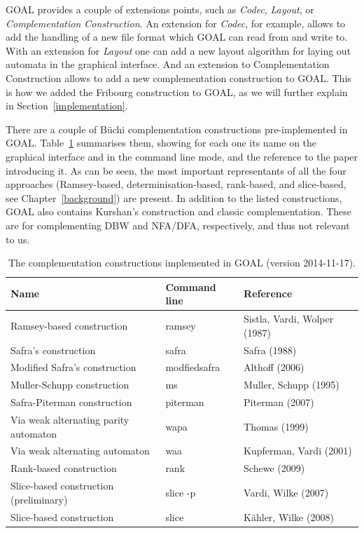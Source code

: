 GOAL provides a couple of extensions points, such as \textit{Codec}, \textit{Layout}, or \textit{Complementation Construction}. An extension for \textit{Codec}, for example, allows to add the handling of a new file format which GOAL can read from and write to. With an extension for \textit{Layout} one can add a new layout algorithm for laying out automata in the graphical interface. And an extension to \textsf{Complementation Construction} allows to add a new complementation construction to GOAL. This is how we added the Fribourg construction to GOAL, as we will further explain in Section~\ref{implementation}.

There are a couple of Büchi complementation constructions pre-implemented in GOAL. Table~\ref{goal_constructions} summarises them, showing for each one its name on the graphical interface and in the command line mode, and the reference to the paper introducing it. As can be seen, the most important representants of all the four approaches (Ramsey-based, determinisation-based, rank-based, and slice-based, see Chapter~\ref{background}) are present. In addition to the listed constructions, GOAL also contains Kurshan's construction and classic complementation. These are for complementing DBW and NFA/DFA, respectively, and thus not relevant to us.

\begin{table}
\caption{The complementation constructions implemented in GOAL (version 2014-11-17).}
\begin{center}
\begin{tabular}{|l|l|l|}
\hline
Name & Command line & Reference \\
\hline
Ramsey-based construction & ramsey & Sistla, Vardi, Wolper (1987)~\cite{PrasadSistla1987217} \\
\hline
Safra's construction & safra & Safra (1988)~\cite{1988_safra_1} \\
\hline
Modified Safra's construction & modfiedsafra & Althoff (2006)~\cite{2006_althoff} \\
\hline
Muller-Schupp construction & ms & Muller, Schupp (1995)~\cite{Muller199569} \\
\hline
Safra-Piterman construction & piterman & Piterman (2007)~\cite{2007_piterman} \\
\hline
Via weak alternating parity automaton & wapa & Thomas (1999)~\cite{1999_thomas} \\
\hline
Via weak alternating automaton & waa & Kupferman, Vardi (2001) \cite{Kupferman:2001} \\
\hline
Rank-based construction & rank & Schewe (2009) \cite{schewe2009buchi} \\
\hline
Slice-based construction (preliminary) & slice -p & Vardi, Wilke (2007) \cite{vardi2007automata} \\
\hline
Slice-based construction & slice & Kähler, Wilke (2008) \cite{2008_kaehler} \\
\hline
\end{tabular}
\end{center}
\label{goal_constructions}
\end{table}

